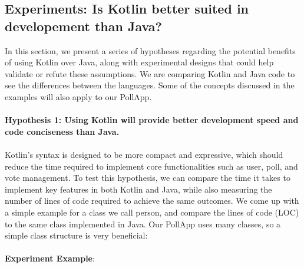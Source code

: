 \subsection{Experiments: Is Kotlin better suited in developement than Java? }

In this section, we present a series of hypotheses regarding the potential benefits of using Kotlin over Java, along with experimental designs that could help validate or refute these assumptions. We are comparing Kotlin and Java code to see the differences between the languages. Some of the concepts discussed in the examples will also apply to our PollApp. 
\\
\\
\textbf{Hypothesis 1: Using Kotlin will provide better development speed and code conciseness than Java.} 
\\
\\
Kotlin’s syntax is designed to be more compact and expressive, which should reduce the time required to implement core functionalities such as user, poll, and vote management. To test this hypothesis, we can compare the time it takes to implement key features in both Kotlin and Java, while also measuring the number of lines of code required to achieve the same outcomes. We come up with a simple example for a class we call person, and compare the lines of code (LOC) to the same class implemented in Java. Our PollApp uses many classes, so a simple class structure is very beneficial:
\\
\\
\textbf{Experiment Example}:
